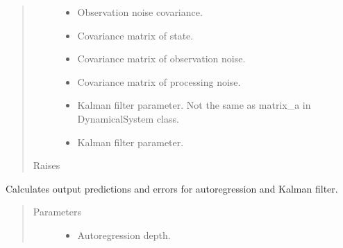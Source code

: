\documentclass[letterpaper,10pt,english]{sphinxmanual}
\begin{document}
\begin{fulllineitems}
\begin{fulllineitems}
\begin{quote}
\begin{description}
\begin{itemize}
\item {} 
\sphinxAtStartPar
{} \textendash{} Observation noise covariance.

\item {} 
\sphinxAtStartPar
{} \textendash{} Covariance matrix of state.

\item {} 
\sphinxAtStartPar
{} \textendash{} Covariance matrix of observation noise.

\item {} 
\sphinxAtStartPar
{} \textendash{} Covariance matrix of processing noise.

\item {} 
\sphinxAtStartPar
{} \textendash{} Kalman filter parameter. Not the same as matrix\_a in DynamicalSystem class.

\item {} 
\sphinxAtStartPar
{} \textendash{} Kalman filter parameter.

\end{itemize}

\item[{Raises}] \leavevmode
\sphinxAtStartPar
{} \textendash{} 

\end{description}\end{quote}

\end{fulllineitems}


\begin{fulllineitems}
\label{\detokenize{LDS.LDS.filters:LDS.LDS.filters.kalman_filtering_siso.KalmanFilteringSISO.predict}}
\sphinxAtStartPar
Calculates output predictions and errors for auto\sphinxhyphen{}regression and Kalman filter.
\begin{quote}\begin{description}
\item[{Parameters}] \leavevmode\begin{itemize}
\item {} 
\sphinxAtStartPar
{} \textendash{} Auto\sphinxhyphen{}regression depth.


\end{itemize}
\end{description}
\end{quote}
\end{fulllineitems}
\end{fulllineitems}
\end{document}
